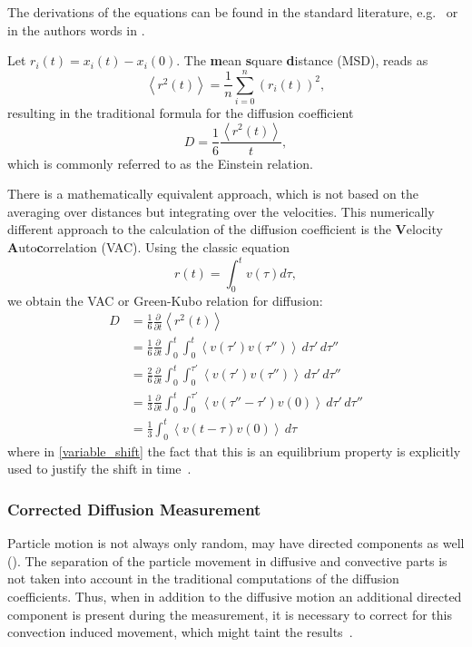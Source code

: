 The derivations of the equations can be found in the standard literature, e.g.~\cite{Frenkel02, Haberlandt} or in the authors words in \cite{NeuenDipl}.

Let $r_i(t) = x_i(t)-x_i(0)$.
The \textbf{m}ean \textbf{s}quare \textbf{d}istance (MSD), reads as
\begin{equation}
\label{MSD}
 \left< r^2(t) \right> = \frac{1}{n}\sum_{i=0}^{n} (r_i(t))^{2},
\end{equation}
resulting in the traditional formula for the diffusion coefficient
\begin{equation}
 D = \frac{1}{6} \frac{\left<r^2(t)\right>}{t},
\end{equation}
which is commonly referred to as the Einstein relation.

There is a mathematically equivalent approach, which is not based on the averaging over distances but integrating over the velocities.
This numerically different approach to the calculation of the diffusion coefficient is the \textbf{V}elocity \textbf{A}uto\textbf{c}orrelation (VAC).
Using the classic equation
\begin{equation}
 r(t) = \int_0^t v(\tau) d\tau, \nonumber
\end{equation}
we obtain the VAC or Green-Kubo relation for diffusion:
\begin{align}
\label{derive_vac}
 D & = \frac{1}{6}\frac{\partial}{\partial t} \left< r^2(t)\right> \\
& = \frac{1}{6}\frac{\partial}{\partial t} \int_0^t \int_0^t \left< v(\tau' ) v(\tau'')\right> \, d\tau' \, d\tau''  \nonumber\\
& = \frac{2}{6}\frac{\partial}{\partial t} \int_0^t \int_0^{\tau'} \left< v(\tau') v(\tau'')\right> \,d\tau' \, d\tau'' \nonumber\\
& = \frac{1}{3} \frac{\partial}{\partial t} \int_0^t \int_0^{\tau'} \left< v(\tau'' -\tau') v(0)\right> \, d\tau' \, d\tau'' \label{variable_shift} \\
& = \frac{1}{3} \int_0^t \left< v(t-\tau) v(0) \right> \, d\tau  \nonumber
\end{align}
where in \eqref{variable_shift} the fact that this is an equilibrium property is explicitly used to justify the shift in time~\cite{Frenkel02}.

\subsubsection{Corrected Diffusion Measurement}
Particle motion is not always only random, may have directed components as well (). 
The separation of the particle movement in diffusive and convective parts is not taken into account in the 
traditional computations of the diffusion coefficients. 
Thus, when in addition to the diffusive motion an additional directed component is present during the measurement, it is necessary to correct for this convection induced movement, which might taint the results~\cite{NeuenDipl}.

